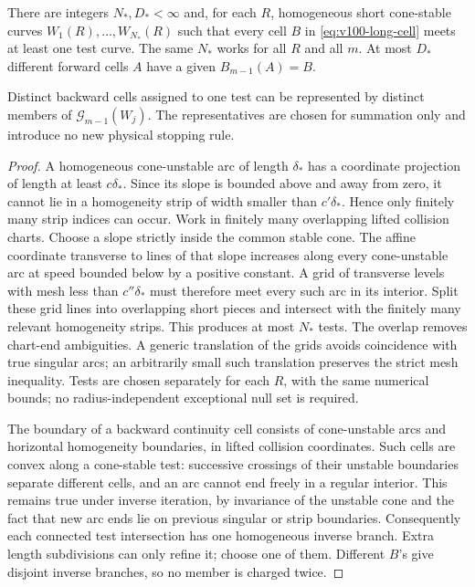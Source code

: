 \begin{lemma}
\label{lem:v100-tests}
There are integers $N_*,D_*<\infty$ and, for each $R$, homogeneous
short cone-stable curves $W_1(R),\ldots,W_{N_*}(R)$ such that every
cell $B$ in \eqref{eq:v100-long-cell} meets at least one test curve.
The same $N_*$ works for all $R$ and all $m$. At most $D_*$ different
forward cells $A$ have a given $B_{m-1}(A)=B$.

Distinct backward cells assigned to one test can be represented by
distinct members of $\mathcal G_{m-1}(W_j)$. The representatives are
chosen for summation only and introduce no new physical stopping rule.
\end{lemma}
\begin{proof}
A homogeneous cone-unstable arc of length $\delta_*$ has a coordinate
projection of length at least $c\delta_*$. Since its slope is bounded
above and away from zero, it cannot lie in a homogeneity strip of
width smaller than $c'\delta_*$. Hence only finitely many strip indices
can occur. Work in finitely many overlapping lifted collision charts.
Choose a slope strictly inside the common stable cone. The affine
coordinate transverse to lines of that slope increases along every
cone-unstable arc at speed bounded below by a positive constant.
A grid of transverse levels with mesh less than $c''\delta_*$ must
therefore meet every such arc in its interior. Split these grid lines
into overlapping short pieces and intersect with the finitely many
relevant homogeneity strips. This produces at most $N_*$ tests.
The overlap removes chart-end ambiguities. A generic translation of
the grids avoids coincidence with true singular arcs; an arbitrarily
small such translation preserves the strict mesh inequality. Tests
are chosen separately for each $R$, with the same numerical bounds;
no radius-independent exceptional null set is required.

The boundary of a backward continuity cell consists of cone-unstable
arcs and horizontal homogeneity boundaries, in lifted collision
coordinates. Such cells are convex along a cone-stable test: successive
crossings of their unstable boundaries separate different cells, and
an arc cannot end freely in a regular interior. This remains true
under inverse iteration, by invariance of the unstable cone and the
fact that new arc ends lie on previous singular or strip boundaries.
Consequently each connected test intersection has one homogeneous
inverse branch. Extra length subdivisions can only refine it; choose
one of them. Different $B$'s give disjoint inverse branches, so no
member is charged twice.


\end{proof}
